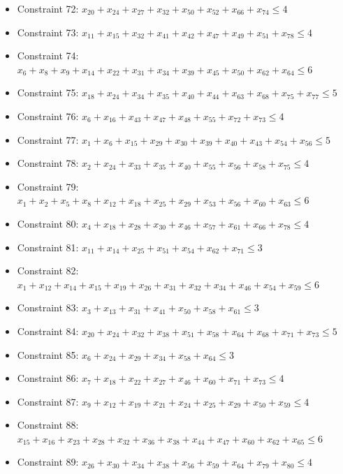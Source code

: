 \documentclass[11pt]{article}
\begin{document}
\begin{itemize}
\item Constraint 72: $x_{20} + x_{24} + x_{27} + x_{32} + x_{50} + x_{52} + x_{66} + x_{74} \le 4$
\item Constraint 73: $x_{11} + x_{15} + x_{32} + x_{41} + x_{42} + x_{47} + x_{49} + x_{51} + x_{78} \le 4$
\item Constraint 74: $x_{6} + x_{8} + x_{9} + x_{14} + x_{22} + x_{31} + x_{34} + x_{39} + x_{45} + x_{50} + x_{62} + x_{64} \le 6$
\item Constraint 75: $x_{18} + x_{24} + x_{34} + x_{35} + x_{40} + x_{44} + x_{63} + x_{68} + x_{75} + x_{77} \le 5$
\item Constraint 76: $x_{6} + x_{16} + x_{43} + x_{47} + x_{48} + x_{55} + x_{72} + x_{73} \le 4$
\item Constraint 77: $x_{1} + x_{6} + x_{15} + x_{29} + x_{30} + x_{39} + x_{40} + x_{43} + x_{54} + x_{56} \le 5$
\item Constraint 78: $x_{2} + x_{24} + x_{33} + x_{35} + x_{40} + x_{55} + x_{56} + x_{58} + x_{75} \le 4$
\item Constraint 79: $x_{1} + x_{2} + x_{5} + x_{8} + x_{12} + x_{18} + x_{25} + x_{29} + x_{53} + x_{56} + x_{60} + x_{63} \le 6$
\item Constraint 80: $x_{4} + x_{18} + x_{28} + x_{30} + x_{46} + x_{57} + x_{61} + x_{66} + x_{78} \le 4$
\item Constraint 81: $x_{11} + x_{14} + x_{25} + x_{51} + x_{54} + x_{62} + x_{71} \le 3$
\item Constraint 82: $x_{1} + x_{12} + x_{14} + x_{15} + x_{19} + x_{26} + x_{31} + x_{32} + x_{34} + x_{46} + x_{54} + x_{59} \le 6$
\item Constraint 83: $x_{3} + x_{13} + x_{31} + x_{41} + x_{50} + x_{58} + x_{61} \le 3$
\item Constraint 84: $x_{20} + x_{24} + x_{32} + x_{38} + x_{51} + x_{58} + x_{64} + x_{68} + x_{71} + x_{73} \le 5$
\item Constraint 85: $x_{6} + x_{24} + x_{29} + x_{34} + x_{58} + x_{64} \le 3$
\item Constraint 86: $x_{7} + x_{18} + x_{22} + x_{27} + x_{46} + x_{60} + x_{71} + x_{73} \le 4$
\item Constraint 87: $x_{9} + x_{12} + x_{19} + x_{21} + x_{24} + x_{25} + x_{29} + x_{50} + x_{59} \le 4$
\item Constraint 88: $x_{15} + x_{16} + x_{23} + x_{28} + x_{32} + x_{36} + x_{38} + x_{44} + x_{47} + x_{60} + x_{62} + x_{65} \le 6$
\item Constraint 89: $x_{26} + x_{30} + x_{34} + x_{38} + x_{56} + x_{59} + x_{64} + x_{79} + x_{80} \le 4$

\end{itemize}
\end{document}
